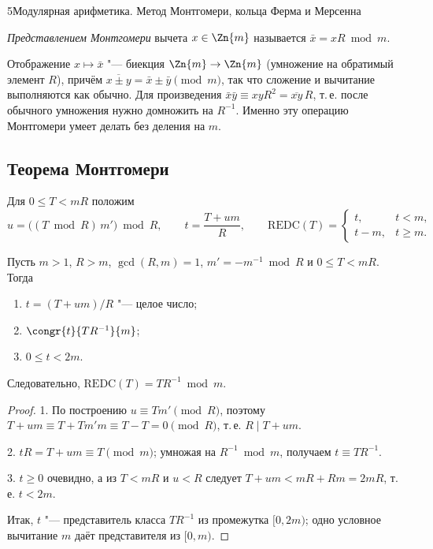 \begin{lecture}{5}{Модулярная арифметика. Метод Монтгомери, кольца Ферма и Мерсенна}
\begin{definition}
\emph{Представлением Монтгомери} вычета $x \in \Zn{m}$ называется $\bar x = xR \bmod m$.
\end{definition}

Отображение $x \mapsto \bar x$ "--- биекция $\Zn{m} \to \Zn{m}$ (умножение на обратимый
элемент $R$), причём $\overline{x \pm y} = \bar x \pm \bar y \pmod m$, так что сложение и
вычитание выполняются как обычно. Для произведения
$\bar x \bar y \equiv xy R^2 = \overline{xy}\, R$, т.\,е. после обычного умножения нужно
домножить на $R^{-1}$. Именно эту операцию Монтгомери умеет делать без деления на $m$.

\subsection{Теорема Монтгомери}

\begin{definition}
Для $0 \le T < mR$ положим
\[
  u = \bigl((T \bmod R)\, m'\bigr) \bmod R, \qquad t = \frac{T + um}{R}, \qquad
  \mathrm{REDC}(T) = \begin{cases} t, & t < m,\\ t - m, & t \ge m. \end{cases}
\]
\end{definition}

\begin{theorem}[Монтгомери]\label{l5:redc}
Пусть $m > 1$, $R > m$, $\gcd(R, m) = 1$, $m' = -m^{-1} \bmod R$ и $0 \le T < mR$. Тогда
\begin{enumerate}
  \item $t = (T + um)/R$ "--- целое число;
  \item $\congr{t}{TR^{-1}}{m}$;
  \item $0 \le t < 2m$.
\end{enumerate}
Следовательно, $\mathrm{REDC}(T) = TR^{-1} \bmod m$.
\end{theorem}

\begin{proof}
1. По построению $u \equiv T m' \pmod R$, поэтому
$T + um \equiv T + T m' m \equiv T - T = 0 \pmod R$, т.\,е. $R \mid T + um$.

2. $tR = T + um \equiv T \pmod m$; умножая на $R^{-1} \bmod m$, получаем $t \equiv TR^{-1}$.

3. $t \ge 0$ очевидно, а из $T < mR$ и $u < R$ следует
$T + um < mR + Rm = 2mR$, т.\,е. $t < 2m$.

Итак, $t$ "--- представитель класса $TR^{-1}$ из промежутка $[0, 2m)$; одно условное
вычитание $m$ даёт представителя из $[0, m)$.
\end{proof}


\end{lecture}
